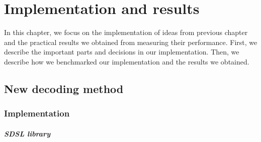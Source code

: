 \chapter{Implementation and results}
\label{kap:kap4}

In this chapter, we focus on the implementation of ideas from previous chapter
and the practical results we obtained from measuring their performance. First,
we describe the important parts and decisions in our implementation. Then, we
describe how we benchmarked our implementation and the results we obtained.

\section{New decoding method}

\subsection{Implementation}

\paragraph{SDSL library}

